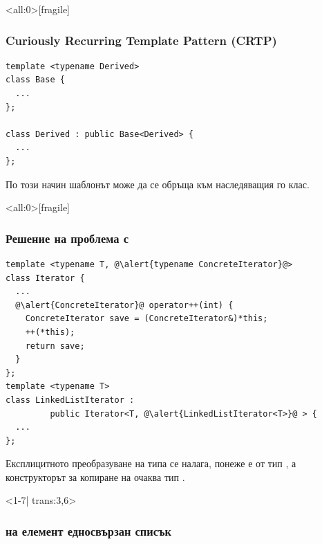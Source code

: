 \documentclass[alsotrans]{beamerswitch}
\def\crtp{all:0}
\begin{document}
\begin{frame}<\crtp>[fragile]
  \frametitle{Curiously Recurring Template Pattern (CRTP)}

\begin{lstlisting}
template <typename Derived>
class Base {
  ...
};

class Derived : public Base<Derived> {
  ...
};
\end{lstlisting}
  По този начин шаблонът  може да се обръща към наследяващия го клас.
\end{frame}

\begin{frame}<\crtp>[fragile]
  \frametitle{Решение на проблема с }

  \small
\begin{lstlisting}
template <typename T, @\alert{typename ConcreteIterator}@>
class Iterator {
  ...
  @\alert{ConcreteIterator}@ operator++(int) {
    ConcreteIterator save = (ConcreteIterator&)*this;
    ++(*this);
    return save;
  }
};
template <typename T>
class LinkedListIterator :
         public Iterator<T, @\alert{LinkedListIterator<T>}@ > {
  ...
};
\end{lstlisting}
\pause
Експлицитното преобразуване на типа се налага, понеже  е от тип , а конструкторът за копиране на  очаква тип .
\end{frame}

\begin{frame}<1-7| trans:3,6>
  \frametitle{ на елемент  едносвързан списък}

  \begin{center}
  \end{center}
\end{frame}
\end{document}
